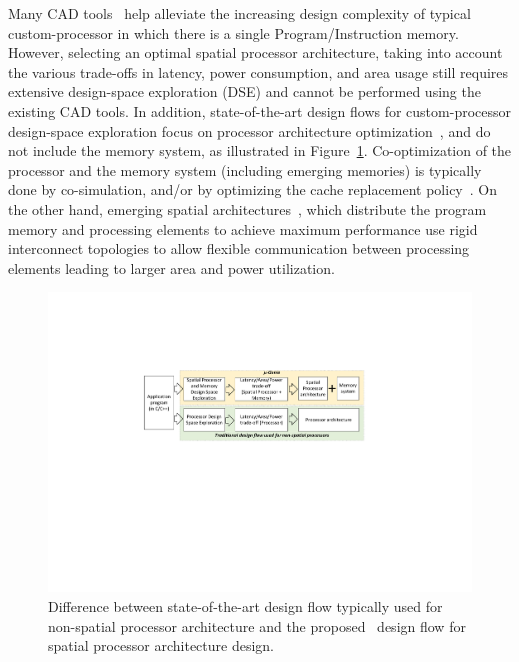 Many CAD tools~\cite{synopsystool,tensilica,codasiptool} help alleviate the increasing design complexity of typical custom-processor in which there is a single Program/Instruction memory. However, selecting an optimal spatial processor architecture, taking into account the various trade-offs in latency, power consumption, and area usage still requires extensive design-space exploration (DSE) and cannot be performed using the existing CAD tools.
In addition, state-of-the-art design flows for custom-processor design-space exploration focus on processor architecture optimization~\cite{Meloni2012,EusseSAMOS2014,Jozwiak2013,Karuri2009}, and do not include the memory system, as illustrated in Figure~\ref{fig:intro}. Co-optimization of the processor and the memory system (including emerging memories) is typically done by co-simulation, and/or by optimizing the cache replacement policy~\cite{4798259,7092595,6271803,Mittal13f}.
On the other hand, emerging spatial architectures~\cite{7284058,8686088}, which distribute the program memory and processing elements to achieve maximum performance use rigid interconnect topologies to allow flexible communication between processing elements leading to larger area and power utilization.

\begin{figure}[ht]
    \centering
    \includegraphics[clip, trim=6cm 10.5cm 6.4cm 5.2cm, width=1.0\linewidth]{images/intro_figure.pdf} %
    \caption{\small Difference between state-of-the-art design flow typically used for non-spatial processor architecture and the proposed \frameworkname~design flow for spatial processor architecture design.}
    \label{fig:intro}
\end{figure}


